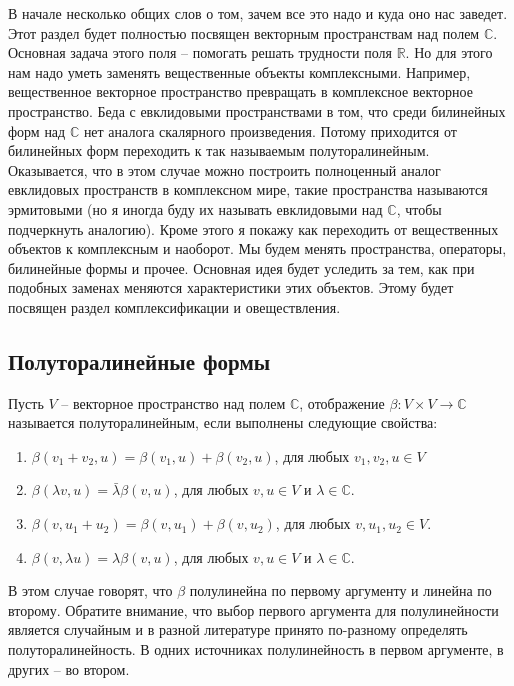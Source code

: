 В начале несколько общих слов о том, зачем все это надо и куда оно нас заведет.
Этот раздел будет полностью посвящен векторным пространствам над полем $\mathbb C$.
Основная задача этого поля -- помогать решать трудности поля $\mathbb R$.
Но для этого нам надо уметь заменять вещественные объекты комплексными.
Например, вещественное векторное пространство превращать в комплексное векторное пространство.
Беда с евклидовыми пространствами в том, что среди билинейных форм над $\mathbb C$ нет аналога скалярного произведения.
Потому приходится от билинейных форм переходить к так называемым полуторалинейным.
Оказывается, что в этом случае можно построить полноценный аналог евклидовых пространств в комплексном мире, такие пространства называются эрмитовыми (но я иногда буду их называть евклидовыми над $\mathbb C$, чтобы подчеркнуть аналогию).
Кроме этого я покажу как переходить от вещественных объектов к комплексным и наоборот.
Мы будем менять пространства, операторы, билинейные формы и прочее.
Основная идея будет уследить за тем, как при подобных заменах меняются характеристики этих объектов.
Этому будет посвящен раздел комплексификации и овеществления.

\subsection{Полуторалинейные формы}

\begin{definition}
Пусть $V$ -- векторное пространство над полем $\mathbb C$, отображение $\beta \colon V\times V\to \mathbb C$ называется полуторалинейным, если выполнены следующие свойства:
\begin{enumerate}
\item $\beta(v_1+v_2, u) = \beta(v_1,u) + \beta(v_2, u)$, для любых $v_1, v_2, u\in V$

\item $\beta(\lambda v, u) = \bar \lambda \beta(v, u)$, для любых $v, u \in V$ и $\lambda\in \mathbb C$.

\item $\beta(v, u_1 + u_2) = \beta(v, u_1) + \beta(v, u_2)$, для любых $v, u_1, u_2\in V$.

\item $\beta(v, \lambda u) = \lambda\beta(v, u)$, для любых $v,u \in V$ и $\lambda \in \mathbb C$.
\end{enumerate}
\end{definition}

В этом случае говорят, что $\beta$ полулинейна по первому аргументу и линейна по второму.
Обратите внимание, что выбор первого аргумента для полулинейности является случайным и в разной литературе принято по-разному определять полуторалинейность.
В одних источниках полулинейность в первом аргументе, в других -- во втором.

